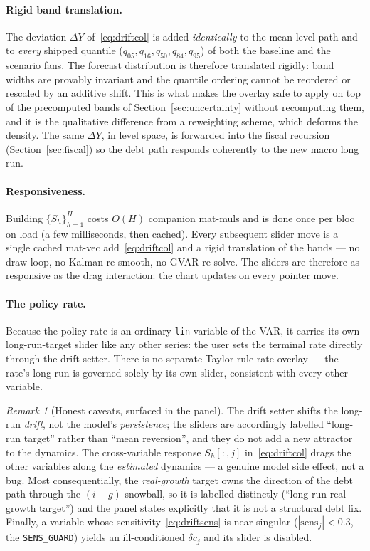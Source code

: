 \documentclass[11pt]{article}
\theoremstyle{definition}
\theoremstyle{remark}
\newtheorem{remark}{Remark}
\begin{document}
\paragraph{Rigid band translation.}
The deviation $\Delta Y$ of~\eqref{eq:driftcol} is added \emph{identically}
to the mean level path and to \emph{every} shipped quantile
($q_{05},q_{16},q_{50},q_{84},q_{95}$) of both the baseline and the
scenario fans. The forecast distribution is therefore translated
rigidly: band widths are provably invariant and the quantile ordering
cannot be reordered or rescaled by an additive shift. This is what makes
the overlay safe to apply on top of the precomputed bands of
Section~\ref{sec:uncertainty} without recomputing them, and it is the
qualitative difference from a reweighting scheme, which deforms the
density. The same $\Delta Y$, in level space, is forwarded into the
fiscal recursion (Section~\ref{sec:fiscal}) so the debt path responds
coherently to the new macro long run.

\paragraph{Responsiveness.}
Building $\{S_h\}_{h=1}^{H}$ costs $O(H)$ companion mat-muls and is done
once per bloc on load (a few milliseconds, then cached). Every
subsequent slider move is a single cached mat-vec add~\eqref{eq:driftcol}
and a rigid translation of the bands --- no draw loop, no Kalman
re-smooth, no GVAR re-solve. The sliders are therefore as responsive as
the drag interaction: the chart updates on every pointer move.

\paragraph{The policy rate.}
Because the policy rate is an ordinary \texttt{lin} variable of the VAR,
it carries its own long-run-target slider like any other series: the
user sets the terminal rate directly through the drift setter. There is
no separate Taylor-rule rate overlay --- the rate's long run is governed
solely by its own slider, consistent with every other variable.

\begin{remark}[Honest caveats, surfaced in the panel]
\label{rem:drift_caveats}
The drift setter shifts the long-run \emph{drift}, not the model's
\emph{persistence}; the sliders are accordingly labelled ``long-run
target'' rather than ``mean reversion'', and they do not add a new
attractor to the dynamics. The cross-variable response $S_h[:,j]$
in~\eqref{eq:driftcol} drags the other variables along the
\emph{estimated} dynamics --- a genuine model side effect, not a bug.
Most consequentially, the \emph{real-growth} target owns the direction
of the debt path through the $(i-g)$ snowball, so it is labelled
distinctly (``long-run real growth target'') and the panel states
explicitly that it is not a structural debt fix. Finally, a variable
whose sensitivity~\eqref{eq:driftsens} is near-singular
($|\mathrm{sens}_j| < 0.3$, the \texttt{SENS\_GUARD}) yields an
ill-conditioned $\delta c_j$ and its slider is disabled.
\end{remark}
\end{document}
